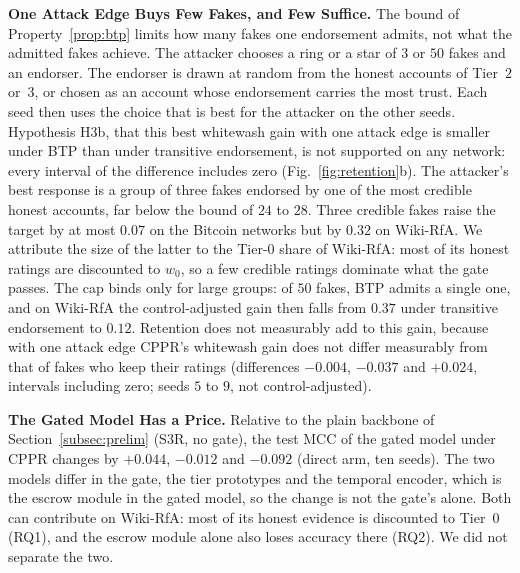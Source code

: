 \documentclass[lettersize,journal]{IEEEtran}
\begin{document}
\smallskip\noindent\textbf{One Attack Edge Buys Few Fakes, and Few Suffice.}
The bound of Property~\ref{prop:btp} limits how many fakes one endorsement admits, not what the admitted fakes achieve.
The attacker chooses a ring or a star of $3$ or $50$ fakes and an endorser. The endorser is drawn at random from the honest accounts of Tier~$2$ or~$3$, or chosen as an account whose endorsement carries the most trust. Each seed then uses the choice that is best for the attacker on the other seeds.
Hypothesis H3b, that this best whitewash gain with one attack edge is smaller under BTP than under transitive endorsement, is not supported on any network: every interval of the difference includes zero (Fig.~\ref{fig:retention}b).
The attacker's best response is a group of three fakes endorsed by one of the most credible honest accounts, far below the bound of $24$ to $28$.
Three credible fakes raise the target by at most $0.07$ on the Bitcoin networks but by $0.32$ on Wiki-RfA.
We attribute the size of the latter to the Tier-$0$ share of Wiki-RfA: most of its honest ratings are discounted to $w_0$, so a few credible ratings dominate what the gate passes.
The cap binds only for large groups: of $50$ fakes, BTP admits a single one, and on Wiki-RfA the control-adjusted gain then falls from $0.37$ under transitive endorsement to $0.12$.
Retention does not measurably add to this gain, because with one attack edge CPPR's whitewash gain does not differ measurably from that of fakes who keep their ratings (differences $-0.004$, $-0.037$ and $+0.024$, intervals including zero; seeds $5$ to $9$, not control-adjusted).

\smallskip\noindent\textbf{The Gated Model Has a Price.}
Relative to the plain backbone of Section~\ref{subsec:prelim} (S3R, no gate), the test MCC of the gated model under CPPR changes by $+0.044$, $-0.012$ and $-0.092$ (direct arm, ten seeds).
The two models differ in the gate, the tier prototypes and the temporal encoder, which is the escrow module in the gated model, so the change is not the gate's alone.
Both can contribute on Wiki-RfA: most of its honest evidence is discounted to Tier~$0$ (RQ1), and the escrow module alone also loses accuracy there (RQ2).
We did not separate the two.
\end{document}
